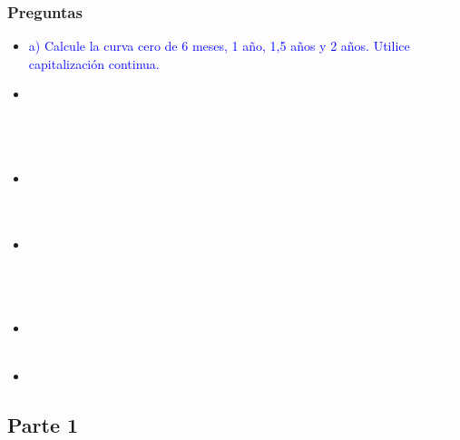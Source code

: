 \documentclass{beamer}
\begin{document}
  \begin{frame}
    \frametitle{Preguntas}
    \begin{itemize}
      \scriptsize
      \item {\Large\textcolor{blue}{a) Calcule la curva cero de 6 meses, 1 año, 1,5 años y 2 años. Utilice capitalización continua.}}
      \vspace{3pt}
      \item {\textcolor{white}{b) Grafique la curva cero y comente (sin realizar cálculos) si la pendiente de la curva de los bonos del BCCh (con cupones) es positiva o negativa. ¿Qué factor explica el \textit{spread} entre ambas curvas?, ¿Por qué el \textit{spread} aumenta a mayor madurez?}}
      \vspace{3pt}
      \item {\textcolor{white}{c) Comente cuál es la interpretación económica detrás de la pendiente observada en la curva cero. ¿Qué nos dice respecto a la probabilidad de recesión?}}
      \vspace{3pt}
      \item {\textcolor{white}{d) Considerando que usted tiene la información de la curva cero, la curva \textit{forward} y la curva de las \textit{yields} de los bonos de gobierno. Señale qué curva usaría para calcular el valor presente de las ganancias o pérdidas de los contratos \textit{forward}.}}
      \vspace{3pt}
      \item {\textcolor{white}{e) ¿Cuál es el rol de las probabilidades neutrales al riesgo en d)?, ¿Qué rol juega la condición de no arbitraje?}}
      \vspace{3pt}
      \item {\textcolor{white}{f) Realice el punto a) y b)  utilizando matrices en Excel/R/Python.}}
      \vspace{3pt}
    \end{itemize}
  \end{frame}

\subsection{Parte 1}

\newcommand{\capcontinuacero}{ F = P \cdot e^{-rT}}
\newcommand{\capcontinua}{F = \sum_{i=1}^{n} \frac{C_i}{e^{r_i t_i}} + \frac{P}{e^{r_n t_n}}}

\end{document}
